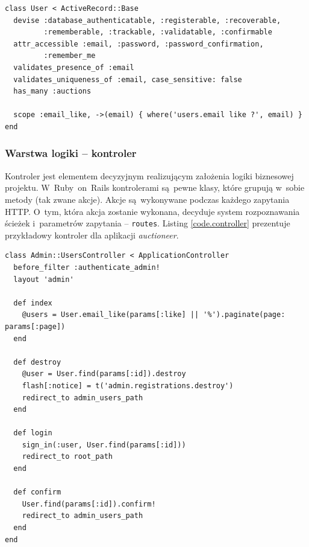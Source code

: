 \begin{lstlisting}[label={code.user}]
class User < ActiveRecord::Base
  devise :database_authenticatable, :registerable, :recoverable,
         :rememberable, :trackable, :validatable, :confirmable
  attr_accessible :email, :password, :password_confirmation,
         :remember_me
  validates_presence_of :email
  validates_uniqueness_of :email, case_sensitive: false
  has_many :auctions

  scope :email_like, ->(email) { where('users.email like ?', email) }
end
\end{lstlisting}

\subsubsection{Warstwa logiki -- kontroler}

Kontroler jest elementem decyzyjnym realizującym założenia logiki biznesowej projektu. W~Ruby~on~Rails kontrolerami są~pewne klasy, które grupują w~sobie metody (tak zwane akcje). Akcje są~wykonywane podczas każdego zapytania HTTP. O~tym, która akcja zostanie wykonana, decyduje system rozpoznawania ścieżek i~parametrów zapytania -- \texttt{routes}. Listing \ref{code.controller} prezentuje przykładowy kontroler dla aplikacji \textit{auctioneer}.

\begin{lstlisting}[label={code.controller}]
class Admin::UsersController < ApplicationController
  before_filter :authenticate_admin!
  layout 'admin'

  def index
    @users = User.email_like(params[:like] || '%').paginate(page: params[:page])
  end

  def destroy
    @user = User.find(params[:id]).destroy
    flash[:notice] = t('admin.registrations.destroy')
    redirect_to admin_users_path
  end

  def login
    sign_in(:user, User.find(params[:id]))
    redirect_to root_path
  end

  def confirm
    User.find(params[:id]).confirm!
    redirect_to admin_users_path
  end
end
\end{lstlisting}

